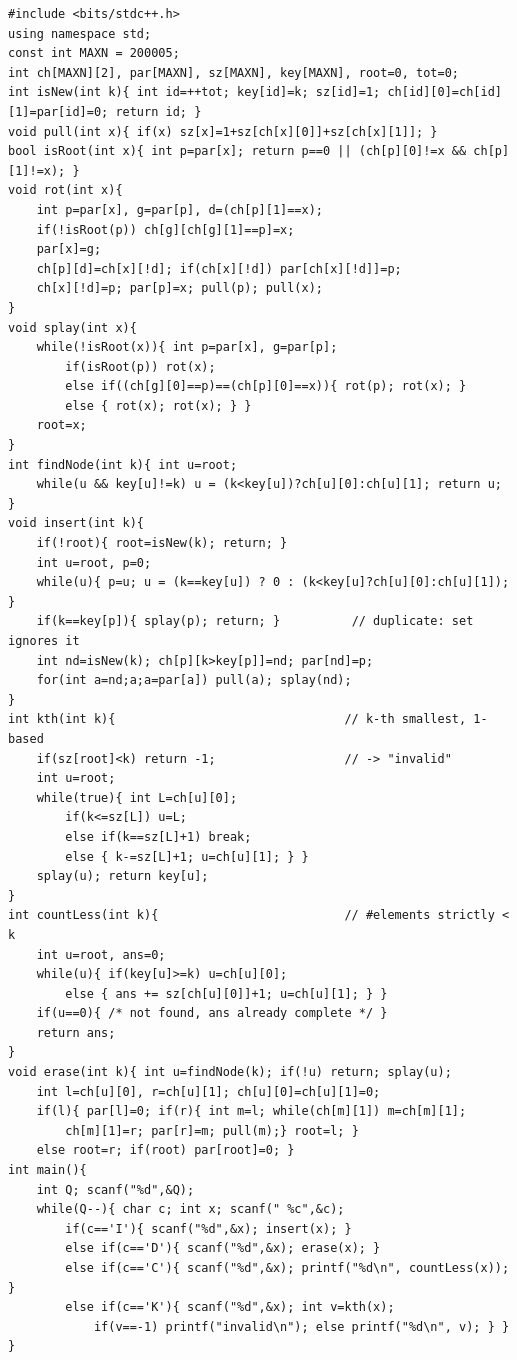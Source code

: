 \begin{lstlisting}[caption={SPOJ ORDERSET with a bottom-up size-maintained splay (swap in lst:c23-topdown if recursion depth is a worry). Node 0 is the null sentinel with size 0. ASCII only}, label={lst:c23-orderset}]
#include <bits/stdc++.h>
using namespace std;
const int MAXN = 200005;
int ch[MAXN][2], par[MAXN], sz[MAXN], key[MAXN], root=0, tot=0;
int isNew(int k){ int id=++tot; key[id]=k; sz[id]=1; ch[id][0]=ch[id][1]=par[id]=0; return id; }
void pull(int x){ if(x) sz[x]=1+sz[ch[x][0]]+sz[ch[x][1]]; }
bool isRoot(int x){ int p=par[x]; return p==0 || (ch[p][0]!=x && ch[p][1]!=x); }
void rot(int x){
    int p=par[x], g=par[p], d=(ch[p][1]==x);
    if(!isRoot(p)) ch[g][ch[g][1]==p]=x;
    par[x]=g;
    ch[p][d]=ch[x][!d]; if(ch[x][!d]) par[ch[x][!d]]=p;
    ch[x][!d]=p; par[p]=x; pull(p); pull(x);
}
void splay(int x){
    while(!isRoot(x)){ int p=par[x], g=par[p];
        if(isRoot(p)) rot(x);
        else if((ch[g][0]==p)==(ch[p][0]==x)){ rot(p); rot(x); }
        else { rot(x); rot(x); } }
    root=x;
}
int findNode(int k){ int u=root;
    while(u && key[u]!=k) u = (k<key[u])?ch[u][0]:ch[u][1]; return u; }
void insert(int k){
    if(!root){ root=isNew(k); return; }
    int u=root, p=0;
    while(u){ p=u; u = (k==key[u]) ? 0 : (k<key[u]?ch[u][0]:ch[u][1]); }
    if(k==key[p]){ splay(p); return; }          // duplicate: set ignores it
    int nd=isNew(k); ch[p][k>key[p]]=nd; par[nd]=p;
    for(int a=nd;a;a=par[a]) pull(a); splay(nd);
}
int kth(int k){                                // k-th smallest, 1-based
    if(sz[root]<k) return -1;                  // -> "invalid"
    int u=root;
    while(true){ int L=ch[u][0];
        if(k<=sz[L]) u=L;
        else if(k==sz[L]+1) break;
        else { k-=sz[L]+1; u=ch[u][1]; } }
    splay(u); return key[u];
}
int countLess(int k){                          // #elements strictly < k
    int u=root, ans=0;
    while(u){ if(key[u]>=k) u=ch[u][0];
        else { ans += sz[ch[u][0]]+1; u=ch[u][1]; } }
    if(u==0){ /* not found, ans already complete */ }
    return ans;
}
void erase(int k){ int u=findNode(k); if(!u) return; splay(u);
    int l=ch[u][0], r=ch[u][1]; ch[u][0]=ch[u][1]=0;
    if(l){ par[l]=0; if(r){ int m=l; while(ch[m][1]) m=ch[m][1];
        ch[m][1]=r; par[r]=m; pull(m);} root=l; }
    else root=r; if(root) par[root]=0; }
int main(){
    int Q; scanf("%d",&Q);
    while(Q--){ char c; int x; scanf(" %c",&c);
        if(c=='I'){ scanf("%d",&x); insert(x); }
        else if(c=='D'){ scanf("%d",&x); erase(x); }
        else if(c=='C'){ scanf("%d",&x); printf("%d\n", countLess(x)); }
        else if(c=='K'){ scanf("%d",&x); int v=kth(x);
            if(v==-1) printf("invalid\n"); else printf("%d\n", v); } }
}
\end{lstlisting}

